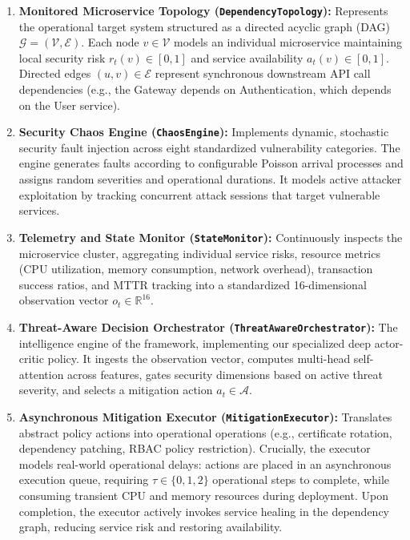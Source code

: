 \documentclass[11pt,a4paper]{article}
\begin{document}
\begin{enumerate}
    \item \textbf{Monitored Microservice Topology (\texttt{DependencyTopology}):} Represents the operational target system structured as a directed acyclic graph (DAG) $\mathcal{G} = (\mathcal{V}, \mathcal{E})$. Each node $v \in \mathcal{V}$ models an individual microservice maintaining local security risk $r_t(v) \in [0, 1]$ and service availability $a_t(v) \in [0, 1]$. Directed edges $(u, v) \in \mathcal{E}$ represent synchronous downstream API call dependencies (e.g., the Gateway depends on Authentication, which depends on the User service).
    \item \textbf{Security Chaos Engine (\texttt{ChaosEngine}):} Implements dynamic, stochastic security fault injection across eight standardized vulnerability categories. The engine generates faults according to configurable Poisson arrival processes and assigns random severities and operational durations. It models active attacker exploitation by tracking concurrent attack sessions that target vulnerable services.
    \item \textbf{Telemetry and State Monitor (\texttt{StateMonitor}):} Continuously inspects the microservice cluster, aggregating individual service risks, resource metrics (CPU utilization, memory consumption, network overhead), transaction success ratios, and MTTR tracking into a standardized 16-dimensional observation vector $o_t \in \mathbb{R}^{16}$.
    \item \textbf{Threat-Aware Decision Orchestrator (\texttt{ThreatAwareOrchestrator}):} The intelligence engine of the framework, implementing our specialized deep actor-critic policy. It ingests the observation vector, computes multi-head self-attention across features, gates security dimensions based on active threat severity, and selects a mitigation action $a_t \in \mathcal{A}$.
    \item \textbf{Asynchronous Mitigation Executor (\texttt{MitigationExecutor}):} Translates abstract policy actions into operational operations (e.g., certificate rotation, dependency patching, RBAC policy restriction). Crucially, the executor models real-world operational delays: actions are placed in an asynchronous execution queue, requiring $\tau \in \{0, 1, 2\}$ operational steps to complete, while consuming transient CPU and memory resources during deployment. Upon completion, the executor actively invokes service healing in the dependency graph, reducing service risk and restoring availability.
\end{enumerate}
\end{document}
